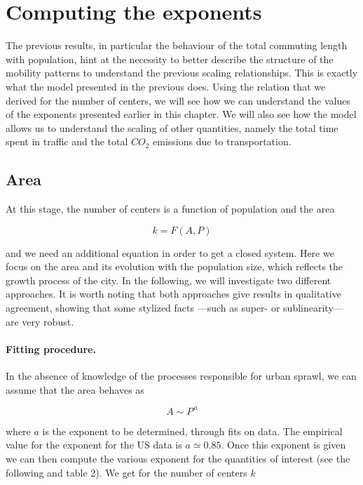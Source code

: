 \section{Computing the exponents}

The previous results, in particular the behaviour of the total commuting length
with population, hint at the necessity to better describe the structure of the
mobility patterns to understand the previous scaling relationships. This is
exactly what the model presented in the previous does.
Using the relation that we derived for the number of centers, we will see how we
can understand the values of the exponents presented earlier in this chapter. We
will also see how the model allows us to understand the scaling of other
quantities, namely the total time spent in traffic and the total $CO_2$
emissions due to transportation.

\subsection{Area}

At this stage, the number of centers is a function of population and the area

\begin{equation}
    k = F\left(A,P\right)
\end{equation}

and we need an additional equation in order to get a closed system. Here we
focus on the area and its evolution with the population size, which reflects the
growth process of the city. In the following, we will investigate two different
approaches. It is worth noting that both approaches give results in qualitative
agreement, showing that some stylized facts ---such as super- or sublinearity---
are very robust.\\ 

\paragraph{Fitting procedure.}

In the absence of knowledge of the processes responsible for urban sprawl, we
can assume that the area behaves as 

\begin{equation}
    A \sim P^{\,a}
    \label{eq:fit}
\end{equation}

where $a$ is the exponent to be determined, through fits on data. The empirical
value for the exponent for the US data is $a\simeq 0.85$. Once this exponent is
given we can then compute the various exponent for the quantities of interest
(see the following and table 2). We get for the number of centers $k$

